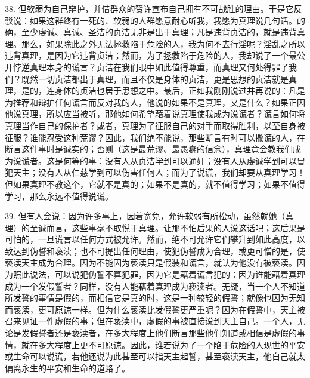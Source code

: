 38. 但软弱为自己辩护，并借群众的赞许宣布自己拥有不可战胜的理由。于是它反驳说：如果这群终有一死的、软弱的人群愿意耐心听我，我愿为真理说几句话。的确，至少虔诚、真诚、圣洁的贞洁无非是出于真理；凡是违背贞洁的，就是违背真理。那么，如果除此之外无法拯救陷于危险的人，我为何不去行淫呢？淫乱之所以违背真理，是因为它违背贞洁；然而，为了拯救陷于危险的人，我却说了一个最公开悖逆真理本身的谎言？贞洁在我们眼中如此值得尊重，而真理又何处得罪了我们？既然一切贞洁都出于真理，而且不仅是身体的贞洁，更是思想的贞洁就是真理，是的，连身体的贞洁也居于思想之中。最后，正如我刚刚说过并再说的：凡是为推荐和辩护任何谎言而反对我的人，他说的如果不是真理，又是什么？如果正因他说真理，所以应当被听，那他如何希望藉着说真理使我成为说谎者？谎言如何将真理当作自己的保护者？或者，真理为了征服自己的对手而取得胜利，以至自身被征服？谁能忍受这种荒谬？因此，我们绝不能说，那些断言有时可以撒谎的人，在断言这件事时是诚实的；否则（这是最荒谬、最愚蠢的信念），真理竟会教我们成为说谎者。这是何等的事：没有人从贞洁学到可以通奸；没有人从虔诚学到可以冒犯天主；没有人从仁慈学到可以伤害任何人；而为了说谎，我们却要从真理学习！但如果真理不教这个，它就不是真的；如果不是真的，就不值得学习；如果不值得学习，那么永远不值得说谎。\par

39. 但有人会说：因为许多事上，因着宽免，允许软弱有所松动，虽然就她（真理）的至诚而言，这些事毫不取悦于真理。让那不怕后果的人说这话吧；这后果是可怕的，一旦谎言以任何方式被允许。然而，绝不可允许它们攀升到如此高度，以致达到伪誓和亵渎；也不可提出任何理由，使犯伪誓成为合理，或更可憎的是，使亵渎天主成为合理。因为不能因为亵渎只是假装和谎言，就认为他没有被亵渎。因为照此说法，可以说犯伪誓不算犯罪，因为它是藉着谎言犯的：因为谁能藉着真理成为一个发假誓者？同样，没有人能藉着真理成为亵渎者。无疑，当一个人不知道所发誓的事情是假的，而相信它是真的时，这是一种较轻的假誓；就像也因为无知而亵渎，更可原谅一样。但为什么亵渎比发假誓更严重呢？因为在假誓中，天主被召来见证一件虚假的事；但在亵渎中，虚假的事被直接说到天主自己。一个人，无论是发假誓者还是亵渎者，在多大程度上他们断言那些他们知道或相信是虚假的事情，就在多大程度上更不可原谅。因此，谁若说为了一个陷于危险的人现世的平安或生命可以说谎，若他还说为此甚至可以指天主起誓，甚至亵渎天主，他自己就太偏离永生的平安和生命的道路了。\par

